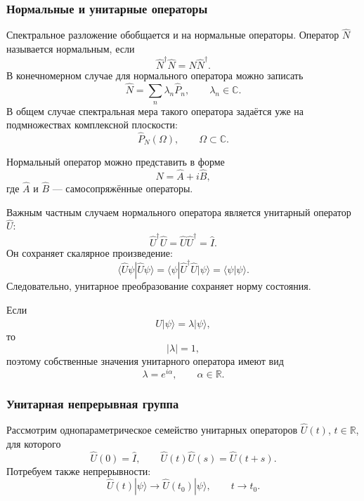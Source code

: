 \documentclass[12pt,a4paper]{article}
\begin{document}
\subsubsection{Нормальные и унитарные операторы}

Спектральное разложение обобщается и на нормальные операторы.
Оператор $\hat N$ называется нормальным, если
\[
    \boxed{
        \hat N^\dagger\hat N
        =
        \hat N\hat N^\dagger
    }.
\]
В конечномерном случае для нормального оператора можно записать
\[
    \hat N
    =
    \sum_n\lambda_n\hat P_n,
    \qquad
    \lambda_n\in\mathbb C.
\]
В общем случае спектральная мера такого оператора задаётся уже на
подмножествах комплексной плоскости:
\[
    \hat P_N(\Omega),
    \qquad
    \Omega\subset\mathbb C.
\]

Нормальный оператор можно представить в форме
\[
    \boxed{
        \hat N=\hat A+i\hat B
    },
\]
где $\hat A$ и $\hat B$ --- самосопряжённые операторы.

Важным частным случаем нормального оператора является унитарный
оператор $\hat U$:
\[
    \boxed{
        \hat U^\dagger\hat U
        =
        \hat U\hat U^\dagger
        =
        \hat I
    }.
\]
Он сохраняет скалярное произведение:
\[
    \langle\hat U\psi|\hat U\psi\rangle
    =
    \langle\psi|
        \hat U^\dagger\hat U
    |\psi\rangle
    =
    \langle\psi|\psi\rangle.
\]
Следовательно, унитарное преобразование сохраняет норму состояния.

Если
\[
    \hat U|\psi\rangle
    =
    \lambda|\psi\rangle,
\]
то
\[
    |\lambda|=1,
\]
поэтому собственные значения унитарного оператора имеют вид
\[
    \boxed{
        \lambda=e^{i\alpha},
        \qquad
        \alpha\in\mathbb R
    }.
\]


\subsubsection{Унитарная непрерывная группа}

Рассмотрим однопараметрическое семейство унитарных операторов
$\hat U(t)$, $t\in\mathbb R$, для которого
\[
    \boxed{
        \hat U(0)=\hat I,
        \qquad
        \hat U(t)\hat U(s)
        =
        \hat U(t+s)
    }.
\]
Потребуем также непрерывности:
\[
    \boxed{
        \hat U(t)|\psi\rangle
        \longrightarrow
        \hat U(t_0)|\psi\rangle,
        \qquad
        t\to t_0
    }.
\]
\end{document}
